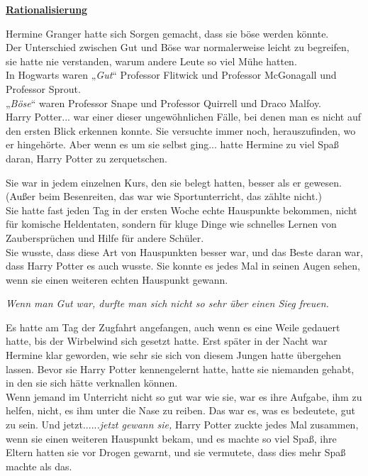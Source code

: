 

\hypertarget{rationalisierung}{%

\textbf{\uline{Rationalisierung}}

Hermine Granger hatte sich Sorgen gemacht, dass sie böse werden könnte.\\ Der Unterschied zwischen Gut und Böse war normalerweise leicht zu begreifen, sie hatte nie verstanden, warum andere Leute so viel Mühe hatten.\\ In Hogwarts waren „\emph{Gut}“ Professor Flitwick und Professor McGonagall und Professor Sprout.\\ „\emph{Böse}“ waren Professor Snape und Professor Quirrell und Draco Malfoy.\\ Harry Potter... war einer dieser ungewöhnlichen Fälle, bei denen man es nicht auf den ersten Blick erkennen konnte. Sie versuchte immer noch, herauszufinden, wo er hingehörte. Aber wenn es um sie selbst ging... hatte Hermine zu viel Spaß daran, Harry Potter zu zerquetschen.

Sie war in jedem einzelnen Kurs, den sie belegt hatten, besser als er gewesen.\\ (Außer beim Besenreiten, das war wie Sportunterricht, das zählte nicht.)\\ Sie hatte fast jeden Tag in der ersten Woche echte Hauspunkte bekommen, nicht für komische Heldentaten, sondern für kluge Dinge wie schnelles Lernen von Zaubersprüchen und Hilfe für andere Schüler.\\ Sie wusste, dass diese Art von Hauspunkten besser war, und das Beste daran war, dass Harry Potter es auch wusste. Sie konnte es jedes Mal in seinen Augen sehen, wenn sie einen weiteren echten Hauspunkt gewann.

\emph{Wenn man Gut war, durfte man sich nicht so sehr über einen Sieg freuen.}

Es hatte am Tag der Zugfahrt angefangen, auch wenn es eine Weile gedauert hatte, bis der Wirbelwind sich gesetzt hatte. Erst später in der Nacht war Hermine klar geworden, wie sehr sie sich von diesem Jungen hatte übergehen lassen. Bevor sie Harry Potter kennengelernt hatte, hatte sie niemanden gehabt, in den sie sich hätte verknallen können.\\ Wenn jemand im Unterricht nicht so gut war wie sie, war es ihre Aufgabe, ihm zu helfen, nicht, es ihm unter die Nase zu reiben. Das war es, was es bedeutete, gut zu sein. Und jetzt.....\emph{.jetzt gewann sie,} Harry Potter zuckte jedes Mal zusammen, wenn sie einen weiteren Hauspunkt bekam, und es machte so viel Spaß, ihre Eltern hatten sie vor Drogen gewarnt, und sie vermutete, dass dies mehr Spaß machte als das.

}
